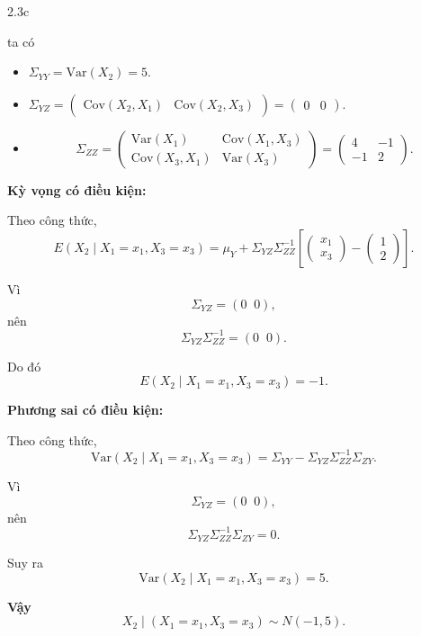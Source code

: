 \begin{question}{2.3c}
\begin{answer}
ta có
\begin{itemize}
    \item $\Sigma_{YY} = \mathrm{Var}(X_2) = 5$.
    \item $\Sigma_{YZ} = 
        \begin{pmatrix} 
        \mathrm{Cov}(X_2, X_1) & \mathrm{Cov}(X_2, X_3)
        \end{pmatrix} = 
        \begin{pmatrix}
        0 & 0
        \end{pmatrix}$.
    \item 
        \[
        \Sigma_{ZZ} =
        \begin{pmatrix}
        \mathrm{Var}(X_1) & \mathrm{Cov}(X_1, X_3)\\
        \mathrm{Cov}(X_3, X_1) & \mathrm{Var}(X_3)
        \end{pmatrix}
        =
        \begin{pmatrix}
        4 & -1\\
        -1 & 2
        \end{pmatrix}.
        \]
\end{itemize}

\textbf{Kỳ vọng có điều kiện:}

Theo công thức,
\[
E(X_2 \mid X_1 = x_1, X_3 = x_3)
= \mu_Y + \Sigma_{YZ}\Sigma_{ZZ}^{-1}
\left[
\begin{pmatrix}
x_1\\
x_3
\end{pmatrix}
-
\begin{pmatrix}
1\\
2
\end{pmatrix}
\right].
\]

Vì
\[
\Sigma_{YZ} = (0 \;\; 0),
\]
nên
\[
\Sigma_{YZ}\Sigma_{ZZ}^{-1} = (0 \;\; 0).
\]

Do đó
\[
E(X_2 \mid X_1 = x_1, X_3 = x_3) = -1.
\]

\textbf{Phương sai có điều kiện:}

Theo công thức,
\[
\mathrm{Var}(X_2 \mid X_1 = x_1, X_3 = x_3)
= \Sigma_{YY} - \Sigma_{YZ}\Sigma_{ZZ}^{-1}\Sigma_{ZY}.
\]

Vì
\[
\Sigma_{YZ} = (0 \;\; 0),
\]
nên
\[
\Sigma_{YZ}\Sigma_{ZZ}^{-1}\Sigma_{ZY} = 0.
\]

Suy ra
\[
\mathrm{Var}(X_2 \mid X_1 = x_1, X_3 = x_3) = 5.
\]

\textbf{Vậy}
\[
X_2 \mid (X_1 = x_1, X_3 = x_3) \sim N(-1, 5).
\]

\end{answer}
\end{question}